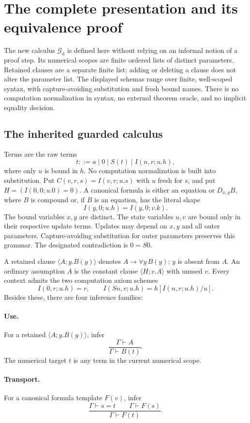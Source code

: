 \clearpage
\section{The complete presentation and its equivalence proof}
\label{sec:deterministic}

The new calculus $\mathcal G_{\mathrm d}$ is defined here without relying on
an informal notion of a proof step. Its numerical scopes are finite ordered
lists of distinct parameters. Retained clauses are a separate finite list;
adding or deleting a clause does not alter the parameter list. The displayed
schemas range over finite, well-scoped syntax, with capture-avoiding
substitution and fresh bound names. There is no computation normalization in
syntax, no external theorem oracle, and no implicit equality decision.

\subsection{The inherited guarded calculus}

Terms are the raw terms
\[
 t ::= a\mid 0\mid S(t)\mid I(n,r;u.h),
\]
where only $u$ is bound in $h$. No computation normalization is built into
substitution. Put $C(v,r,s)=I(v,r;u.s)$ with $u$ fresh for $s$, and put
$H=(I(0,0;u.0)=0)$. A canonical formula is either an equation or $D_{x,y}B$,
where $B$ is compound or, if $B$ is an equation, has the literal shape
\[
                  I(y,0;u.h)=I(y,0;v.k).                 \tag{G}
\]
The bound variables $x,y$ are distinct. The state variables $u,v$ are bound
only in their respective update terms. Updates may depend on $x,y$ and all
outer parameters. Capture-avoiding substitution for outer parameters preserves
this grammar. The designated contradiction is $0=S0$.

A retained clause $\langle A;y.B(y)\rangle$ denotes
$A\to\forall y\,B(y)$; $y$ is absent from $A$. An ordinary assumption $A$
is the constant clause $\langle H;v.A\rangle$ with unused $v$. Every context
admits the two computation axiom schemes
\[
 I(0,r;u.h)=r,\qquad
 I(Sn,r;u.h)=h[I(n,r;u.h)/u].
\]
Besides these, there are four inference families:
\paragraph{Use.} For a retained $\langle A;y.B(y)\rangle$, infer
\[
 \frac{\Gamma\vdash A}{\Gamma\vdash B(t)}.
\]
The numerical target $t$ is any term in the current numerical scope.
\paragraph{Transport.} For a canonical formula template $F(v)$, infer
\[
 \frac{\Gamma\vdash s=t\qquad\Gamma\vdash F(s)}{\Gamma\vdash F(t)}.
\]
